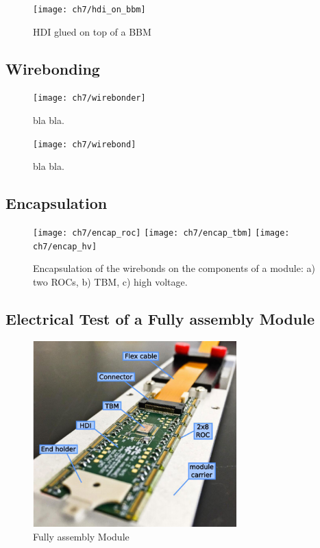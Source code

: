 \begin{figure}[!h]
  \centering
  \texttt{[image: ch7/hdi\_on\_bbm]}
  \caption[Gluing result]{HDI glued on top of a BBM}\label{fig:gantry}
\end{figure}

\subsection{Wirebonding}


\begin{figure}[!h]
  \centering
  \texttt{[image: ch7/wirebonder]}
  \caption[bla for index.]{bla bla.}\label{fig:wirebonder}
\end{figure}


\begin{figure}[!h]
  \centering
  \texttt{[image: ch7/wirebond]}
  \caption[bla for index.]{bla bla.}\label{fig:wirebond}
\end{figure}


\subsection{Encapsulation}


\begin{figure}[!h]
  \centering
  \texttt{[image: ch7/encap\_roc]}
  \texttt{[image: ch7/encap\_tbm]}
  \texttt{[image: ch7/encap\_hv]}
  \caption[Encapsulation results]{Encapsulation of the wirebonds on the components of a module: a) two ROCs, b) TBM, c) high voltage.}\label{fig:encap}
\end{figure}



\subsection{Electrical Test of a Fully assembly Module}


\begin{figure}[!h]
  \centering
  \includegraphics[width=0.7\textwidth]{../images/ch7/fully_asem_mod}
  \caption[Fully assembly Module]{Fully assembly Module}\label{fig:fully_asem_mod}
\end{figure}

